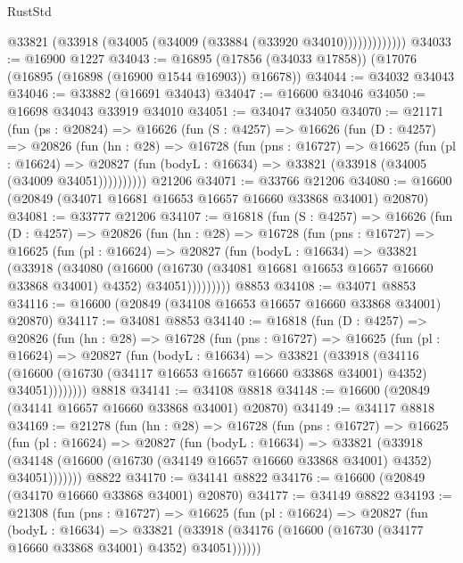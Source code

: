 \begin{lexlean}{RustStd}
\begin{coremodule}
{\begin{coremodule}
{{{{{{{{{{{{{{{{{{{{{{{{{{{{{{{{{{{{{{{{{{{{{{{{{{{{{{{                  @33821 (@33918 (@34005 (@34009 (@33884 (@33920 @34010)))))))))))))
@34033 := @16900 @1227
@34043 := @16895 (@17856 (@34033 @17858)) (@17076 (@16895 (@16898 (@16900 @1544 @16903)) @16678))
@34044 := @34032 @34043
@34046 := @33882 (@16691 @34043)
@34047 := @16600 @34046
@34050 := @16698 @34043 @33919 @34010
@34051 := @34047 @34050
@34070 := @21171
    (fun (ps : @20824) =>
    @16626
      (fun (S : @4257) =>
      @16626
        (fun (D : @4257) =>
        @20826
          (fun (hn : @28) =>
          @16728
            (fun (pns : @16727) =>
            @16625
              (fun (pl : @16624) =>
              @20827 (fun (bodyL : @16634) => @33821 (@33918 (@34005 (@34009 @34051))))))))))
    @21206
@34071 := @33766 @21206
@34080 := @16600 (@20849 (@34071 @16681 @16653 @16657 @16660 @33868 @34001) @20870)
@34081 := @33777 @21206
@34107 := @16818
    (fun (S : @4257) =>
    @16626
      (fun (D : @4257) =>
      @20826
        (fun (hn : @28) =>
        @16728
          (fun (pns : @16727) =>
          @16625
            (fun (pl : @16624) =>
            @20827
              (fun (bodyL : @16634) =>
              @33821
                (@33918
                  (@34080
                    (@16600
                      (@16730 (@34081 @16681 @16653 @16657 @16660 @33868 @34001) @4352)
                      @34051)))))))))
    @8853
@34108 := @34071 @8853
@34116 := @16600 (@20849 (@34108 @16653 @16657 @16660 @33868 @34001) @20870)
@34117 := @34081 @8853
@34140 := @16818
    (fun (D : @4257) =>
    @20826
      (fun (hn : @28) =>
      @16728
        (fun (pns : @16727) =>
        @16625
          (fun (pl : @16624) =>
          @20827
            (fun (bodyL : @16634) =>
            @33821
              (@33918
                (@34116
                  (@16600 (@16730 (@34117 @16653 @16657 @16660 @33868 @34001) @4352) @34051))))))))
    @8818
@34141 := @34108 @8818
@34148 := @16600 (@20849 (@34141 @16657 @16660 @33868 @34001) @20870)
@34149 := @34117 @8818
@34169 := @21278
    (fun (hn : @28) =>
    @16728
      (fun (pns : @16727) =>
      @16625
        (fun (pl : @16624) =>
        @20827
          (fun (bodyL : @16634) =>
          @33821
            (@33918
              (@34148 (@16600 (@16730 (@34149 @16657 @16660 @33868 @34001) @4352) @34051)))))))
    @8822
@34170 := @34141 @8822
@34176 := @16600 (@20849 (@34170 @16660 @33868 @34001) @20870)
@34177 := @34149 @8822
@34193 := @21308
    (fun (pns : @16727) =>
    @16625
      (fun (pl : @16624) =>
      @20827
        (fun (bodyL : @16634) =>
        @33821 (@33918 (@34176 (@16600 (@16730 (@34177 @16660 @33868 @34001) @4352) @34051))))))
}}}}}}}}}}}}}}}}}}}}}}}}}}}}}}}}}}}}}}}}}}}}}}}}}}}}}}}
\end{coremodule}}
\end{coremodule}
\end{lexlean}
